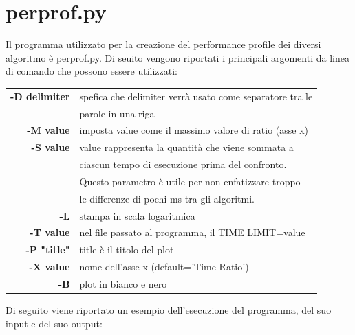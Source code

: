 \section{perprof.py}\label{perf_profile_py}
Il programma utilizzato per la creazione del performance profile dei diversi algoritmo è perprof.py\cite{salvagnin_perf}. Di seuito vengono riportati i principali argomenti da linea di comando che possono essere utilizzati:

\begin{table}[h]
\begin{tabular}{|r|l|}
\hline
\textbf{-D delimiter} & {spefica che delimiter verrà usato come separatore tra le}\\
& {parole in una riga}\\
\hline
\textbf{-M value} & {imposta value come il massimo valore di ratio (asse x)}\\
\hline
\textbf{-S value} & {value rappresenta la quantità che viene sommata a}\\
& {ciascun tempo di esecuzione prima del confronto.}\\
& {Questo parametro è utile per non enfatizzare troppo}\\
& {le differenze di pochi ms tra gli algoritmi.}\\
\hline
\textbf{-L} & {stampa in scala logaritmica}\\
\hline
\textbf{-T value} & {nel file passato al programma, il TIME LIMIT=value}\\
\hline
\textbf{-P "title"} & {title è il titolo del plot}\\
\hline
\textbf{-X value} & {nome dell'asse x (default='Time Ratio')}\\
\hline
\textbf{-B} & {plot in bianco e nero}\\
\hline
\end{tabular}
\end{table}
Di seguito viene riportato un esempio dell'esecuzione del programma, del suo input e del suo output:
